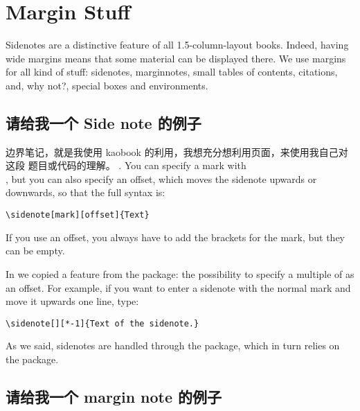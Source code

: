 \setchapterpreamble[u]{\margintoc}
\chapter{Margin Stuff}

Sidenotes are a distinctive feature of all 1.5-column-layout books. 
Indeed, having wide margins means that some material can be displayed 
there. We use margins for all kind of stuff: sidenotes, marginnotes, 
small tables of contents, citations, and, why not?, special boxes and 
environments.

\section{请给我一个 Side note 的例子}

边界笔记，就是我使用 kaobook 的利用，我想充分想利用页面，来使用我自己对这段
题目或代码的理解。
. You can specify a 
mark with \\ 
, but you can also specify an offset, 
which moves the sidenote upwards or downwards, so that the full syntax is:

\begin{lstlisting}[style=kaolstplain]
\sidenote[mark][offset]{Text}
\end{lstlisting}

If you use an offset, you always have to add the brackets for the mark, 
but they can be empty.

In  we copied a feature from the  
package: the possibility to specify a multiple of  
as an offset. For example, if you want to enter a sidenote with the 
normal mark and move it upwards one line, type:

\begin{lstlisting}[style=kaolstplain]
\sidenote[][*-1]{Text of the sidenote.}
\end{lstlisting}

As we said, sidenotes are handled through the  
package, which in turn relies on the  package.

\section{请给我一个 margin note 的例子}



